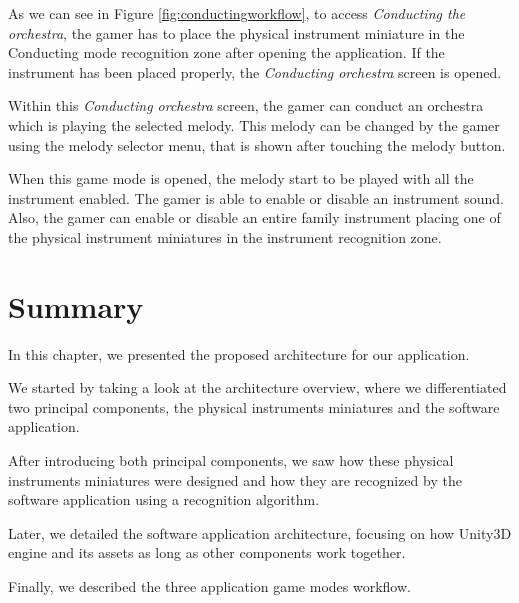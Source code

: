 As we can see in Figure \ref{fig:conductingworkflow}, to access \textit{Conducting the orchestra}, the gamer has to place the physical instrument miniature in the Conducting mode recognition zone after opening the application. If the instrument has been placed properly, the \textit{Conducting orchestra} screen is opened.

Within this \textit{Conducting orchestra} screen, the gamer can conduct an orchestra which is playing the selected melody. This melody can be changed by the gamer using the melody selector menu, that is shown after touching the melody button.

When this game mode is opened, the melody start to be played with all the instrument enabled. The gamer is able to enable or disable an instrument sound. Also, the gamer can enable or disable an entire family instrument placing one of the physical instrument miniatures in the instrument recognition zone.

\FloatBarrier

\section{Summary}
In this chapter, we presented the proposed architecture for our application.

We started by taking a look at the architecture overview, where we differentiated two principal components, the physical instruments miniatures and the software application.

After introducing both principal components, we saw how these physical instruments miniatures were designed and how they are recognized by the software application using a recognition algorithm.

Later, we detailed the software application architecture, focusing on how Unity3D engine and its assets as long as other components work together.

Finally, we described the three application game modes workflow.
